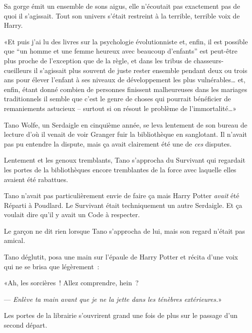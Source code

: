 Sa gorge émit un ensemble de sons aigus, elle n'écoutait pas exactement pas de quoi il s'agissait. Tout son univers s'était restreint à la terrible, terrible voix de Harry.

«Et puis j'ai lu des livres sur la psychologie évolutionniste et, enfin, il est possible que “un homme et une femme heureux avec beaucoup d'enfants” est peut-être plus proche de l'exception que de la règle, et dans les tribus de chasseurs-cueilleurs il s'agissait plus souvent de juste rester ensemble pendant deux ou trois ans pour élever l'enfant à ses niveaux de développement les plus vulnérables… et, enfin, étant donné combien de personnes finissent malheureuses dans les mariages traditionnels il semble que c'est le genre de choses qui pourrait bénéficier de remaniements astucieux -- surtout si on résout le problème de l'immortalité…»

\later

Tano Wolfe, un Serdaigle en cinquième année, se leva lentement de son bureau de lecture d'où il venait de voir Granger fuir la bibliothèque en sanglotant. Il n'avait pas pu entendre la dispute, mais ça avait clairement été une de \emph{ces} disputes.

Lentement et les genoux tremblants, Tano s'approcha du Survivant qui regardait les portes de la bibliothèques encore tremblantes de la force avec laquelle elles avaient été rabattues.

Tano n'avait pas particulièrement envie de faire ça mais Harry Potter \emph{avait} été Réparti à Poudlard. Le Survivant était techniquement un autre Serdaigle. Et ça voulait dire qu'il y avait un Code à respecter.

Le garçon ne dit rien lorsque Tano s'approcha de lui, mais son regard n'était pas amical.

Tano déglutit, posa une main sur l'épaule de Harry Potter et récita d'une voix qui ne se brisa que légèrement~:

«Ah, les sorcières~! Allez comprendre, hein~?

--- \emph{Enlève ta main avant que je ne la jette dans les ténèbres extérieures.}»

Les portes de la librairie s'ouvrirent grand une fois de plus sur le passage d'un second départ.
